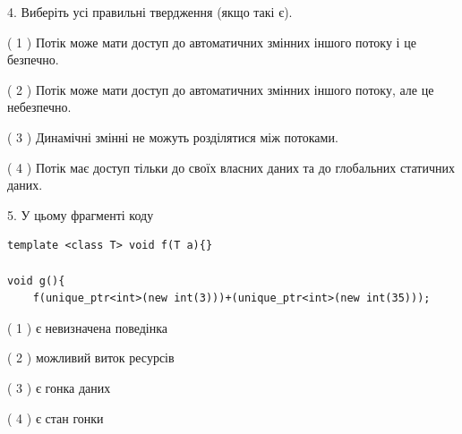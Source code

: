 \documentclass[12pt, ukrainian]{article}
\begin{document}
\begin {large}
{%
4. Виберіть усі правильні твердження (якщо такі є).\par
\vspace{2mm}

( 1 ) Потік може мати доступ до автоматичних змінних іншого потоку і це безпечно.%

( 2 ) Потік може мати доступ до автоматичних змінних іншого потоку, але це небезпечно.%

( 3 ) Динамічні змінні не можуть розділятися між потоками.%

( 4 ) Потік має доступ тільки до своїх власних даних та до глобальних статичних даних.%


5. У цьому фрагменті коду
\begin{verbatim}
template <class T> void f(T a){}

void g(){
    f(unique_ptr<int>(new int(3)))+(unique_ptr<int>(new int(35)));
\end{verbatim}

( 1 ) є невизначена поведінка%

( 2 ) можливий виток ресурсів%

( 3 ) є гонка даних%

( 4 ) є стан гонки%
}
\end {large}
\end{document}
